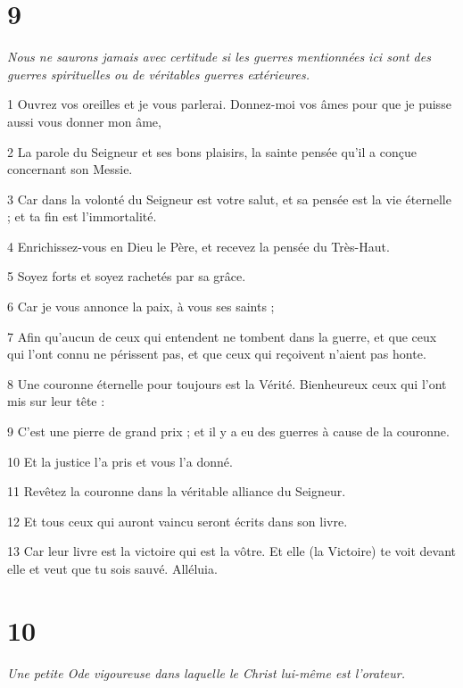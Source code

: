 \chapter{9}

\par \textit{Nous ne saurons jamais avec certitude si les guerres mentionnées ici sont des guerres spirituelles ou de véritables guerres extérieures.}

\par 1 Ouvrez vos oreilles et je vous parlerai. Donnez-moi vos âmes pour que je puisse aussi vous donner mon âme,
\par 2 La parole du Seigneur et ses bons plaisirs, la sainte pensée qu'il a conçue concernant son Messie.
\par 3 Car dans la volonté du Seigneur est votre salut, et sa pensée est la vie éternelle ; et ta fin est l'immortalité.
\par 4 Enrichissez-vous en Dieu le Père, et recevez la pensée du Très-Haut.
\par 5 Soyez forts et soyez rachetés par sa grâce.
\par 6 Car je vous annonce la paix, à vous ses saints ;
\par 7 Afin qu'aucun de ceux qui entendent ne tombent dans la guerre, et que ceux qui l'ont connu ne périssent pas, et que ceux qui reçoivent n'aient pas honte.
\par 8 Une couronne éternelle pour toujours est la Vérité. Bienheureux ceux qui l'ont mis sur leur tête :
\par 9 C'est une pierre de grand prix ; et il y a eu des guerres à cause de la couronne.
\par 10 Et la justice l'a pris et vous l'a donné.
\par 11 Revêtez la couronne dans la véritable alliance du Seigneur.
\par 12 Et tous ceux qui auront vaincu seront écrits dans son livre.
\par 13 Car leur livre est la victoire qui est la vôtre. Et elle (la Victoire) te voit devant elle et veut que tu sois sauvé. Alléluia.

\chapter{10}

\par \textit{Une petite Ode vigoureuse dans laquelle le Christ lui-même est l'orateur.}

